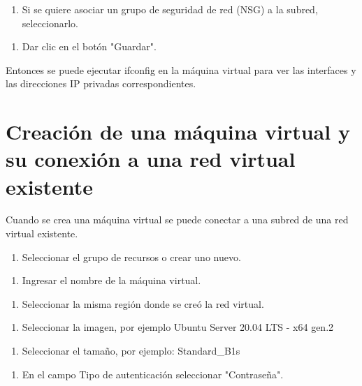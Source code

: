\begin{enumerate}
\item Si se quiere asociar un grupo de seguridad de red (NSG) a la subred, seleccionarlo.
\end{enumerate}

\begin{enumerate}
\item Dar clic en el botón "Guardar".
\end{enumerate}

Entonces se puede ejecutar ifconfig en la máquina virtual para ver las interfaces y las direcciones IP privadas correspondientes.

\section{Creación de una máquina virtual y su conexión a una red virtual existente}

Cuando se crea una máquina virtual se puede conectar a una subred de una red virtual existente.

\begin{enumerate}
\item Seleccionar el grupo de recursos o crear uno nuevo.
\end{enumerate}

\begin{enumerate}
\item Ingresar el nombre de la máquina virtual.
\end{enumerate}

\begin{enumerate}
\item Seleccionar la misma región donde se creó la red virtual.
\end{enumerate}

\begin{enumerate}
\item Seleccionar la imagen, por ejemplo Ubuntu Server 20.04 LTS - x64 gen.2
\end{enumerate}

\begin{enumerate}
\item Seleccionar el tamaño, por ejemplo: Standard\_B1s
\end{enumerate}

\begin{enumerate}
\item En el campo Tipo de autenticación seleccionar "Contraseña".
\end{enumerate}


